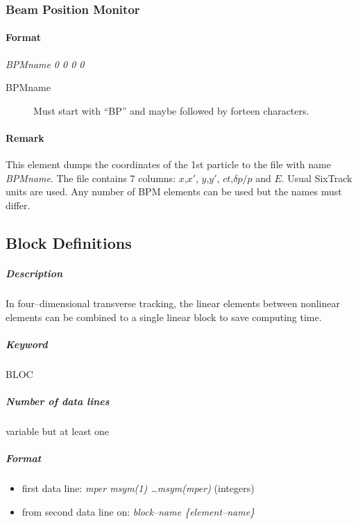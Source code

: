\documentclass[a4paper,11pt]{report}
\begin{document}

\subsubsection{Beam Position Monitor} \label{BPM}
\paragraph{Format} {\em BPMname 0 0 0 0}
\begin{description}
\item [BPMname] Must start with ``BP'' and maybe followed by forteen characters.
\end{description}

\paragraph{Remark}
This element dumps the coordinates of the 1st particle to the file with name {\em BPMname}.
The file contains 7 columns: $x$,$x'$, $y$,$y'$, $ct$,$\delta p/p$ and $E$.
Usual SixTrack units are used. Any number of BPM elements can be used but
the names must differ. 

\subsection{Block Definitions} \label{BloDef}

\subparagraph{Description} In four--dimensional transverse tracking,
the linear elements between nonlinear elements can be combined to a
single linear block to save computing time.

\subparagraph{Keyword} BLOC \subparagraph{Number of data lines}
variable but at least one

\subparagraph{Format}
\begin{itemize}
\item first data line: {\em mper msym(1) \dots msym(mper)}
  \/(integers)
\item from second data line on: {\em block--name \{element--name\} }
\end{itemize}
\end{document}
